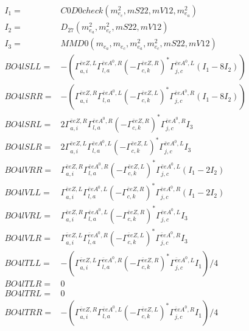 \documentclass[A4,landscape]{article}
\begin{document}
\begin{align} 
I_1 = & C0D0check(m^2_{e_{{c}}}, mS22, mV12, m^2_{e_{{a}}}) \\ 
I_2 = & D_{27}(m^2_{e_{{a}}}, m^2_{e_{{c}}}, mS22, mV12) \\ 
I_3 = & MMD0(m_{e_{{a}}}, m_{e_{{c}}}, m^2_{e_{{a}}}, m^2_{e_{{c}}}, mS22, mV12) \\ 
  BO4lSLL= & -( \Gamma^{\bar{e}e Z ,L}_{a, i} \Gamma^{\bar{e}e A^0 ,R}_{l, a} (- \Gamma^{\bar{e}e Z ,R} _{c, k})^* \Gamma^{\bar{e}e A^0 ,L}_{j, c} (I_1 - 8 I_2)) \\ 
  BO4lSRR= & -( \Gamma^{\bar{e}e Z ,R}_{a, i} \Gamma^{\bar{e}e A^0 ,L}_{l, a} (- \Gamma^{\bar{e}e Z ,L} _{c, k})^* \Gamma^{\bar{e}e A^0 ,R}_{j, c} (I_1 - 8 I_2)) \\ 
  BO4lSRL= & 2  \Gamma^{\bar{e}e Z ,R}_{a, i} \Gamma^{\bar{e}e A^0 ,R}_{l, a} (- \Gamma^{\bar{e}e Z ,R} _{c, k})^* \Gamma^{\bar{e}e A^0 ,R}_{j, c} I_3 \\ 
  BO4lSLR= & 2  \Gamma^{\bar{e}e Z ,L}_{a, i} \Gamma^{\bar{e}e A^0 ,L}_{l, a} (- \Gamma^{\bar{e}e Z ,L} _{c, k})^* \Gamma^{\bar{e}e A^0 ,L}_{j, c} I_3 \\ 
  BO4lVRR= &  \Gamma^{\bar{e}e Z ,R}_{a, i} \Gamma^{\bar{e}e A^0 ,R}_{l, a} (- \Gamma^{\bar{e}e Z ,L} _{c, k})^* \Gamma^{\bar{e}e A^0 ,L}_{j, c} (I_1 - 2 I_2) \\ 
  BO4lVLL= &  \Gamma^{\bar{e}e Z ,L}_{a, i} \Gamma^{\bar{e}e A^0 ,L}_{l, a} (- \Gamma^{\bar{e}e Z ,R} _{c, k})^* \Gamma^{\bar{e}e A^0 ,R}_{j, c} (I_1 - 2 I_2) \\ 
  BO4lVRL= &  \Gamma^{\bar{e}e Z ,R}_{a, i} \Gamma^{\bar{e}e A^0 ,L}_{l, a} (- \Gamma^{\bar{e}e Z ,R} _{c, k})^* \Gamma^{\bar{e}e A^0 ,L}_{j, c} I_3 \\ 
  BO4lVLR= &  \Gamma^{\bar{e}e Z ,L}_{a, i} \Gamma^{\bar{e}e A^0 ,R}_{l, a} (- \Gamma^{\bar{e}e Z ,L} _{c, k})^* \Gamma^{\bar{e}e A^0 ,R}_{j, c} I_3 \\ 
  BO4lTLL= & -( \Gamma^{\bar{e}e Z ,L}_{a, i} \Gamma^{\bar{e}e A^0 ,R}_{l, a} (- \Gamma^{\bar{e}e Z ,R} _{c, k})^* \Gamma^{\bar{e}e A^0 ,L}_{j, c} I_1)/4 \\ 
  BO4lTLR= & 0 \\ 
  BO4lTRL= & 0 \\ 
  BO4lTRR= & -( \Gamma^{\bar{e}e Z ,R}_{a, i} \Gamma^{\bar{e}e A^0 ,L}_{l, a} (- \Gamma^{\bar{e}e Z ,L} _{c, k})^* \Gamma^{\bar{e}e A^0 ,R}_{j, c} I_1)/4 \\ 
\end{align} 
\end{document}
